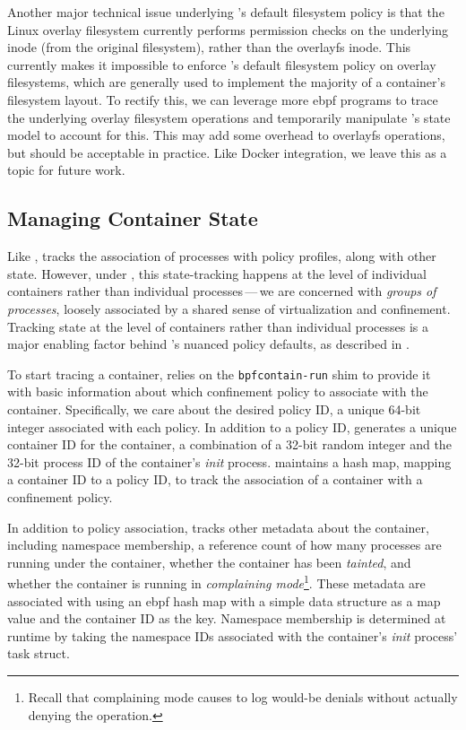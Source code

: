 Another major technical issue underlying \bpfcontain{}'s default filesystem policy is that
the Linux overlay filesystem currently performs permission checks on the underlying inode
(from the original filesystem), rather than the overlayfs inode. This currently makes it
impossible to enforce \bpfcontain{}'s default filesystem policy on overlay filesystems,
which are generally used to implement the majority of a container's filesystem layout.  To
rectify this, we can leverage more \gls{ebpf} programs to trace the underlying overlay
filesystem operations and temporarily manipulate \bpfcontain{}'s state model to account
for this. This may add some overhead to overlayfs operations, but should be acceptable in
practice. Like Docker integration, we leave this as a topic for future work.

\subsection{Managing Container State}%
\label{ss:bpfcontain-state}

Like \bpfbox{}, \bpfcontain{} tracks the association of processes with policy profiles,
along with other state. However, under \bpfcontain{}, this state-tracking happens
at the level of individual containers rather than individual processes\,---\,we are
concerned with \textit{groups of processes}, loosely associated by a shared sense of
virtualization and confinement. Tracking state at the level of containers rather than
individual processes is a major enabling factor behind \bpfcontain{}'s nuanced policy
defaults, as described in .

To start tracing a container, \bpfcontain{} relies on the \texttt{bpfcontain-run} shim to
provide it with basic information about which confinement policy to associate with the
container. Specifically, we care about the desired policy ID, a unique 64-bit integer
associated with each \bpfcontain{} policy. In addition to a policy ID, \bpfcontain{}
generates a unique container ID for the container, a combination of a 32-bit random
integer and the 32-bit process ID of the container's \textit{init} process. \bpfcontain{}
maintains a hash map, mapping a container ID to a policy ID, to track the association of
a container with a confinement policy.

In addition to policy association, \bpfcontain{} tracks other metadata about the
container, including namespace membership, a reference count of how many processes are
running under the container, whether the container has been \textit{tainted}, and whether
the container is running in \textit{complaining mode}\footnote{Recall that complaining
mode causes \bpfcontain{} to log would-be denials without actually denying the
operation.}. These metadata are associated with using an \gls{ebpf} hash map with a simple
data structure as a map value and the container ID as the key. Namespace membership is
determined at runtime by taking the namespace IDs associated with the container's
\textit{init} process' task struct.

